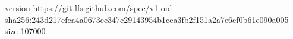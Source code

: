 version https://git-lfs.github.com/spec/v1
oid sha256:243d217efea4a0673ec347c29143954b1cea3fb2f151a2a7e6ef0b61e090a005
size 107000
